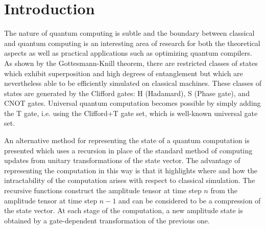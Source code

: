 \documentclass[reqno]{amsart}
\theoremstyle{definition}
\theoremstyle{remark}
\begin{document}

 \maketitle




\section{Introduction}

\noindent
\newline
The nature of quantum computing is subtle and the boundary between classical and quantum computing is an interesting area of research for both the theoretical aspects as well as practical applications such as optimizing quantum compilers. As shown by the Gottesmann-Knill theorem, there are restricted classes of states which exhibit superposition and high degrees of entanglement but which are nevertheless able to be efficiently simulated on classical machines. These classes of states are generated by the Clifford gates: H (Hadamard), S (Phase gate), and CNOT gates. Universal quantum computation becomes possible by simply adding the T gate, i.e. using the Clifford+T gate set, which is well-known universal gate set.

\noindent
\newline
An alternative method for representing the state of a quantum computation is presented which uses a recursion in place of the standard method of computing updates from unitary transformations of the state vector. The advantage of representing the computation in this way is that it highlights where and how the intractability of the computation arises with respect to classical simulation. The recursive functions construct the amplitude tensor at time step $n$ from the amplitude tensor at time step $n-1$  and can be considered to be a compression of the state vector. At each stage of the computation, a new amplitude state is obtained by a gate-dependent transformation of the previous one.
\end{document}
